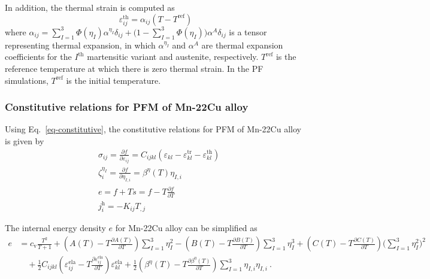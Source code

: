 \documentclass[reprint,3p,sort&compress,times,onecolumn]{elsarticle}
\begin{document}
In addition, the thermal strain is computed as
\begin{equation}
\varepsilon_{ij}^{\text{th}}=\alpha_{ij} (T-T^{\text{ref}})
\end{equation}
where $\alpha_{ij}=\sum_{I=1}^3 \Phi(\eta_I) \alpha^{\eta_I}\delta_{ij} +\big(1-\sum_{I=1}^3\Phi(\eta_I) \big)\alpha^A\delta_{ij}$ is a tensor representing thermal expansion, in which $\alpha^{\eta_I}$ and $\alpha^A$ are thermal expansion coefficients for the $I^{\text{th}}$ martensitic variant and austenite, respectively. $T^{\text{ref}}$ is the reference temperature at which there is zero thermal strain. In the PF simulations, $T^{\text{ref}}$ is the initial temperature.



\subsubsection{Constitutive relations for PFM  of Mn-22Cu alloy} \label{subsec-constitutive}

Using Eq.~\ref{eq-constitutive}, the constitutive relations for PFM of Mn-22Cu alloy is given by
\begin{equation}
\begin{split}
& \sigma_{ij}=\frac{\partial f}{\partial \varepsilon_{ij}}=C_{ijkl}(\varepsilon_{kl}-\varepsilon_{kl}^{\text{tr}} -\varepsilon_{kl}^{\text{th}}) \\
& \zeta^{\eta_I}_i = \frac{\partial f}{\partial \eta_{I,i}}= \beta^{\eta}(T)\eta_{I,i} \\
& e = f+ Ts =f-T \frac{\partial f}{\partial T} \\
& j_i^{\text{h}} =-K_{ij}T_{,j} 
\end{split}  \label{eq-constitutive-improper}
\end{equation}

The internal energy density $e$ for Mn-22Cu alloy can be simplified as
\begin{equation}
\begin{split}
e &=c_\text{v}\frac{T^2}{T+1}+ \left(A(T)-T\frac{\partial A(T)}{\partial T}\right)\sum_{I=1}^3\eta_I^2- \left(B(T)-T\frac{\partial B(T)}{\partial T}\right)\sum_{I=1}^3\eta_I^3+\left(C(T)-T\frac{\partial C(T)}{\partial T}\right)\Big(\sum_{I=1}^3\eta_I^2 \Big)^2 \\
& \quad + \frac{1}{2}C_{ijkl}\left(\varepsilon_{ij}^{\text{ela}}-T\frac{\partial \varepsilon_{ij}^{\text{ela}}}{\partial T} \right)\varepsilon_{kl}^{\text{ela}} +\frac{1}{2}\left(\beta^{\eta}(T)-T\frac{\partial \beta^{\eta}(T)}{\partial T}\right)\sum_{I=1}^3 \eta_{I,i}\eta_{I,i} ~. \\
\end{split} \label{eq-e-Mn}
\end{equation} 
\end{document}
